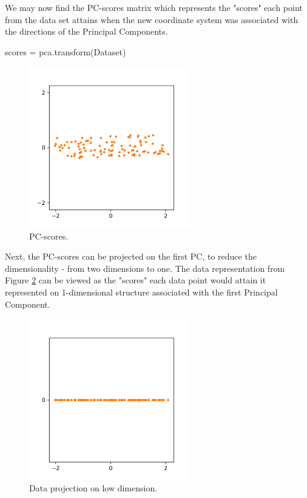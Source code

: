 \documentclass[10pt,twocolumn]{article}
\begin{document}
We may now find the PC-scores matrix which represents the "scores" each point from the data set attains when the new coordinate system was associated with the directions of the Principal Components.
 
\begin{python}
scores = pca.transform(Dataset)
\end{python}

\begin{figure}[H]
\centering\includegraphics[width=7cm]{python-PC-scores.png}
\caption{PC-scores.}
\label{fig:python-PC-scores}
\end{figure}

Next, the PC-scores can be projected on the first PC, to reduce the dimensionality - from two dimensions to one. The data representation from Figure \ref{fig:python-data-projection} can be viewed as the "scores" each data point would attain it represented on 1-dimensional structure associated with the first Principal Component.

\begin{figure}[H]
\centering\includegraphics[width=7cm]{python-data-projection.png}
\caption{Data projection on low dimension.}
\label{fig:python-data-projection}
\end{figure}
\end{document}

